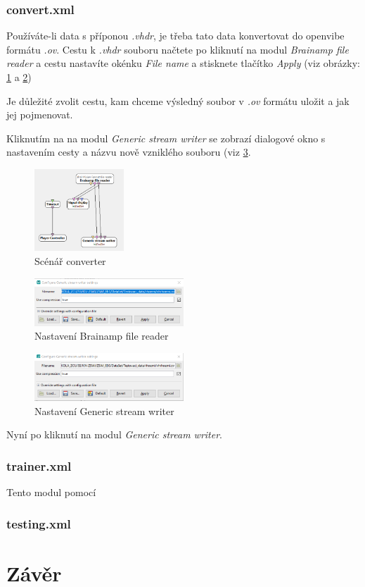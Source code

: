 \documentclass{report}
\begin{document}
\subsection{convert.xml}
 Používáte-li data s příponou \textit{.vhdr}, je třeba tato data konvertovat do openvibe formátu \textit{.ov}. Cestu k \textit{.vhdr} souboru načtete po kliknutí na modul \textit{Brainamp file reader} a cestu nastavíte okénku \textit{File name} a stisknete tlačítko \textit{Apply} (viz obrázky: \ref{fig:converter} a \ref{fig:filereader})
 
 Je důležité zvolit cestu, kam chceme výsledný soubor v \textit{.ov} formátu uložit a jak jej pojmenovat.
 
 Kliknutím na na modul \textit{Generic stream writer} se zobrazí dialogové okno s nastavením cesty a názvu nově vzniklého souboru (viz \ref{fig:filewriter}.
\begin{figure}[!h]
\centering
  \includegraphics[width=0.3\textwidth]{pictures/coverter.png}
  \caption{Scénář converter}
  \label{fig:converter}
 \end{figure}
\begin{figure}[!h]
\centering
  \includegraphics[width=0.5\textwidth]{pictures/setFileReader.png}
  \caption{Nastavení Brainamp file reader}
  \label{fig:filereader}
 \end{figure}
 \begin{figure}[!h]
\centering
  \includegraphics[width=0.5\textwidth]{pictures/configurewriter.png}
  \caption{Nastavení Generic stream writer}
  \label{fig:filewriter}
 \end{figure}
 Nyní po kliknutí na modul \textit{Generic stream writer}.

 
 
 
\subsection{trainer.xml}
Tento modul pomocí 
\subsection{testing.xml}
\chapter{Závěr}
\end{document}
